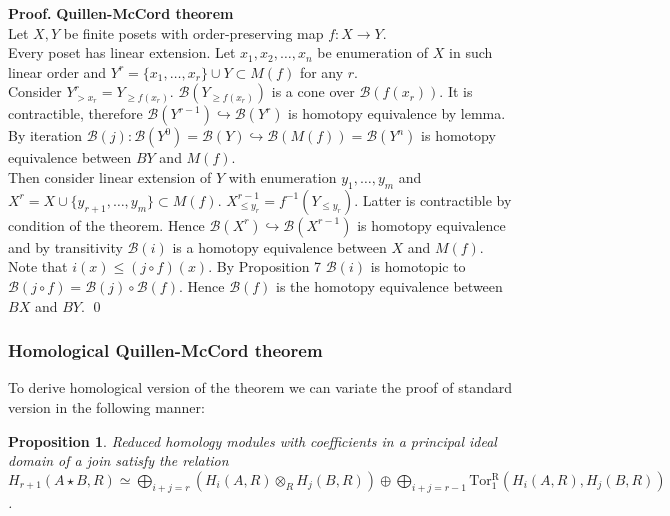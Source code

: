 \documentclass[a4paper, 12pt]{article}
\newtheorem{proposition}{Proposition}
\theoremstyle{definition}
\theoremstyle{remark}
\newenvironment{pf}{\noindent\textbf{Proof.}}{\qed}
\renewcommand{\leq}{\leqslant}
\renewcommand{\geq}{\geqslant}
\begin{document}
\begin{pf} \textbf{Quillen-McCord theorem}\\
  Let $X, Y$ be finite posets with order-preserving map $f : X \to Y$.\\

  Every poset has linear extension. Let $x_1, x_2, \ldots, x_n$ be enumeration of $X$ in such linear order and $Y^r = \{x_1,\ldots,x_r\} \cup Y \subset M(f)$ for any $r$.\\

  Consider $Y^r_{>x_r} = Y_{\geq f(x_r)}$. $\mathcal{B}(Y_{\geq f(x_r)})$ is a cone over $\mathcal{B}(f(x_r))$. It is contractible, therefore $\mathcal{B}(Y^{r-1}) \hookrightarrow \mathcal{B}(Y^{r})$ is homotopy equivalence by lemma. By iteration $\mathcal{B}(j) : \mathcal{B}(Y^{0}) = \mathcal{B}(Y) \hookrightarrow \mathcal{B}(M(f)) = \mathcal{B}(Y^n)$ is homotopy equivalence between $BY$ and $M(f)$.\\

  Then consider linear extension of $Y$ with enumeration $y_1,\ldots,y_m$ and $X^r = X \cup \{y_{r+1},\ldots,y_m\} \subset M(f)$. $X^{r-1}_{\leq y_r} = f^{-1}(Y_{\leqslant y_r})$. Latter is contractible by condition of the theorem. Hence $\mathcal{B}(X^{r}) \hookrightarrow \mathcal{B}(X^{r-1})$ is homotopy equivalence and by transitivity $\mathcal{B}(i)$ is a homotopy equivalence between $X$ and $M(f)$.\\

  Note that $i(x) \leqslant (j \circ f)(x)$. By Proposition 7 $\mathcal{B}(i)$ is homotopic to $\mathcal{B}(j \circ f) = \mathcal{B}(j) \circ \mathcal{B}(f)$. Hence $\mathcal{B}(f)$ is the homotopy equivalence between $BX$ and $BY$.
\end{pf}

\subsubsection{Homological Quillen-McCord theorem}

To derive homological version of the theorem we can variate the proof of standard version in the following manner:\\

\begin{proposition} {\cite[Lemma 2.1]{Milnor56}}
  Reduced homology modules with coefficients in a principal ideal domain of a join satisfy the relation
  $H_{r+1}(A \star B, R) \simeq \bigoplus_{i+j=r}(H_i(A,R) \otimes_R H_j(B,R)) \oplus \bigoplus_{i+j=r-1} \operatorname{Tor_1^R}(H_i(A,R),H_j(B,R))$.
\end{proposition}
\end{document}
